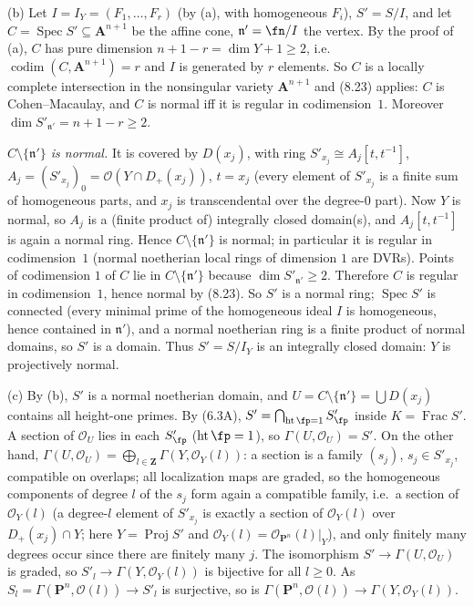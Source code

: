 \documentclass[11pt]{article}
\begin{document}
(b) Let $I=I_Y=(F_1,\dots,F_r)$ (by (a), with homogeneous $F_i$), $S'=S/I$, and let $C=\operatorname{Spec}S'\subseteq\mathbf A^{n+1}$ be the affine cone, $\mathfrak n'=\fn/I$ the vertex. By the proof of (a), $C$ has pure dimension $n+1-r=\dim Y+1\ge2$, i.e.\ $\operatorname{codim}(C,\mathbf A^{n+1})=r$ and $I$ is generated by $r$ elements. So $C$ is a locally complete intersection in the nonsingular variety $\mathbf A^{n+1}$ and (8.23) applies: $C$ is Cohen--Macaulay, and $C$ is normal iff it is regular in codimension~$1$. Moreover $\dim S'_{\mathfrak n'}=n+1-r\ge2$.

\emph{$C\setminus\{\mathfrak n'\}$ is normal.} It is covered by $D(x_j)$, with ring $S'_{x_j}\cong A_j[t,t^{-1}]$, $A_j=(S'_{x_j})_0=\mathcal O(Y\cap D_+(x_j))$, $t=x_j$ (every element of $S'_{x_j}$ is a finite sum of homogeneous parts, and $x_j$ is transcendental over the degree-$0$ part). Now $Y$ is normal, so $A_j$ is a (finite product of) integrally closed domain(s), and $A_j[t,t^{-1}]$ is again a normal ring. Hence $C\setminus\{\mathfrak n'\}$ is normal; in particular it is regular in codimension~$1$ (normal noetherian local rings of dimension $1$ are DVRs). Points of codimension $1$ of $C$ lie in $C\setminus\{\mathfrak n'\}$ because $\dim S'_{\mathfrak n'}\ge2$. Therefore $C$ is regular in codimension~$1$, hence normal by (8.23). So $S'$ is a normal ring; $\operatorname{Spec}S'$ is connected (every minimal prime of the homogeneous ideal $I$ is homogeneous, hence contained in $\mathfrak n'$), and a normal noetherian ring is a finite product of normal domains, so $S'$ is a domain. Thus $S'=S/I_Y$ is an integrally closed domain: $Y$ is projectively normal.

(c) By (b), $S'$ is a normal noetherian domain, and $U=C\setminus\{\mathfrak n'\}=\bigcup D(x_j)$ contains all height-one primes. By (6.3A), $S'=\bigcap_{\operatorname{ht}\fp=1}S'_\fp$ inside $K=\operatorname{Frac}S'$. A section of $\mathcal O_U$ lies in each $S'_\fp$ ($\operatorname{ht}\fp=1$), so $\Gamma(U,\mathcal O_U)=S'$. On the other hand, $\Gamma(U,\mathcal O_U)=\bigoplus_{l\in\mathbf Z}\Gamma(Y,\mathcal O_Y(l))$: a section is a family $(s_j)$, $s_j\in S'_{x_j}$, compatible on overlaps; all localization maps are graded, so the homogeneous components of degree $l$ of the $s_j$ form again a compatible family, i.e.\ a section of $\mathcal O_Y(l)$ (a degree-$l$ element of $S'_{x_j}$ is exactly a section of $\mathcal O_Y(l)$ over $D_+(x_j)\cap Y$; here $Y=\operatorname{Proj}S'$ and $\mathcal O_Y(l)=\mathcal O_{\mathbf P^n}(l)|_Y$), and only finitely many degrees occur since there are finitely many $j$. The isomorphism $S'\to\Gamma(U,\mathcal O_U)$ is graded, so $S'_l\to\Gamma(Y,\mathcal O_Y(l))$ is bijective for all $l\ge0$. As $S_l=\Gamma(\mathbf P^n,\mathcal O(l))\to S'_l$ is surjective, so is $\Gamma(\mathbf P^n,\mathcal O(l))\to\Gamma(Y,\mathcal O_Y(l))$.
\end{document}
